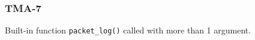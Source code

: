 \newpage
\subsubsection{TMA-7}\label{sec:error_code_tma_7}

Built-in function \texttt{packet\_log()} called with more than 1 argument.


